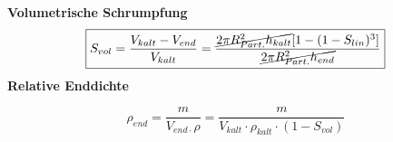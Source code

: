 \textbf{Volumetrische Schrumpfung}\\
    \[
    \boxed{     
        S_{vol} = \frac{V_{kalt} - V_{end}}{V_{kalt}} = \frac{\cancel{2 \pi R_{Part.}^2 h_{kalt}}[1-(1-S_{lin})^3]}{\cancel{2 \pi R_{Part.}^2 h_{end}}}
    }
    \]
\vspace{1mm}
\textbf{Relative Enddichte}\\

\begin{minipage}{0.65\linewidth}
    \[
    \boxed{     
        \rho_{end} = \frac{m}{V_{end \cdot} \rho} = \frac{m}{V_{kalt}  \cdot \rho_{kalt} \cdot (1-S_{vol})}
    }
    \]
\end{minipage}
\begin{minipage}{0.3\linewidth}
    \item
\end{minipage}
\vspace{1mm}
